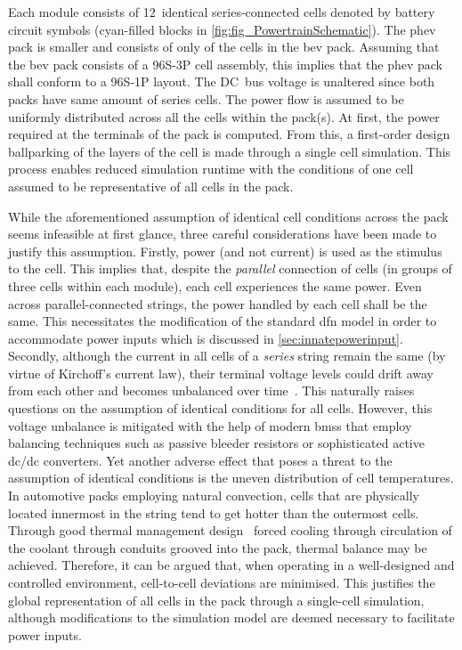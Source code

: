 Each module consists  of 12~identical series-connected cells  denoted by battery
circuit symbols (cyan-filled  blocks in \cref{fig:fig_PowertrainSchematic}). The
\gls{phev} pack is  smaller and consists of only   of the cells in
the \gls{bev} pack. Assuming that the \gls{bev} pack consists of a \mbox{96S-3P}
cell  assembly,  this implies  that  the  \gls{phev}  pack  shall conform  to  a
\mbox{96S-1P} layout. The DC~bus voltage is unaltered since both packs have same
amount of  series cells. The power  flow is assumed to  be uniformly distributed
across all  the cells within  the pack(s). At first,  the power required  at the
terminals of the  pack is computed. From this, a  first-order design ballparking
of the layers of the cell is made through a single cell simulation. This process
enables reduced simulation runtime with the conditions of one cell assumed to be
representative of all cells in the pack.



While the aforementioned assumption of identical cell conditions across the pack
seems infeasible at first glance, three careful considerations have been made to
justify  this assumption.  Firstly,  power  (and not  current)  is  used as  the
stimulus to the cell. This  implies that, despite the \emph{parallel} connection
of cells  (in groups of three  cells within each module),  each cell experiences
the same  power. Even  across parallel-connected strings,  the power  handled by
each cell shall be the same.  This necessitates the modification of the standard
\gls{dfn}  model in  order to  accommodate power  inputs which  is discussed  in
\cref{sec:innatepowerinput}. Secondly,  although the current  in all cells  of a
\emph{series}  string remain  the same  (by virtue  of Kirchoff's  current law),
their  terminal voltage  levels could  drift away  from each  other and  becomes
unbalanced over  time~\cite{Andrea2010}. This naturally raises  questions on the
assumption  of  identical  conditions  for  all  cells.  However,  this  voltage
unbalance is mitigated with the help of modern \glspl{bms} that employ balancing
techniques  such as  passive  bleeder resistors  or  sophisticated active  dc/dc
converters. Yet another adverse effect that  poses a threat to the assumption of
identical  conditions  is  the  uneven distribution  of  cell  temperatures.  In
automotive packs employing natural convection, cells that are physically located
innermost in  the string tend  to get hotter  than the outermost  cells. Through
good thermal management  design \eg~forced cooling through  circulation of the
coolant through conduits grooved into the pack, thermal balance may be achieved.
Therefore,  it  can be  argued  that,  when  operating  in a  well-designed  and
controlled environment,  cell-to-cell deviations  are minimised.  This justifies
the  global representation  of  all  cells in  the  pack  through a  single-cell
simulation, although modifications to the  simulation model are deemed necessary
to facilitate power inputs.


